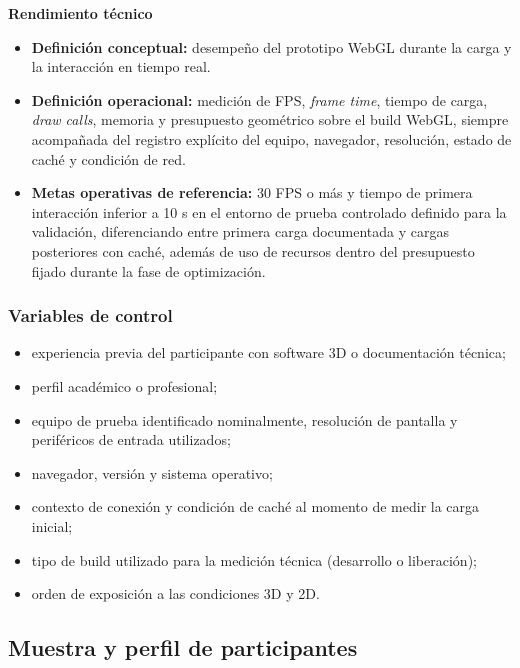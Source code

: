 \textbf{Rendimiento t\'ecnico}
\begin{itemize}
    \item \textbf{Definici\'on conceptual:} desempe\~no del prototipo WebGL durante la carga y la interacci\'on en tiempo real.
    \item \textbf{Definici\'on operacional:} medici\'on de FPS, \textit{frame time}, tiempo de carga, \textit{draw calls}, memoria y presupuesto geom\'etrico sobre el build WebGL, siempre acompa\~nada del registro expl\'icito del equipo, navegador, resoluci\'on, estado de cach\'e y condici\'on de red.
    \item \textbf{Metas operativas de referencia:} 30 FPS o m\'as y tiempo de primera interacci\'on inferior a 10 s en el entorno de prueba controlado definido para la validaci\'on, diferenciando entre primera carga documentada y cargas posteriores con cach\'e, adem\'as de uso de recursos dentro del presupuesto fijado durante la fase de optimizaci\'on.
\end{itemize}

\subsubsection{Variables de control}

\begin{itemize}
    \item experiencia previa del participante con software 3D o documentaci\'on t\'ecnica;
    \item perfil acad\'emico o profesional;
    \item equipo de prueba identificado nominalmente, resoluci\'on de pantalla y perif\'ericos de entrada utilizados;
    \item navegador, versi\'on y sistema operativo;
    \item contexto de conexi\'on y condici\'on de cach\'e al momento de medir la carga inicial;
    \item tipo de build utilizado para la medici\'on t\'ecnica (desarrollo o liberaci\'on);
    \item orden de exposici\'on a las condiciones 3D y 2D.
\end{itemize}

\subsection{Muestra y perfil de participantes}

